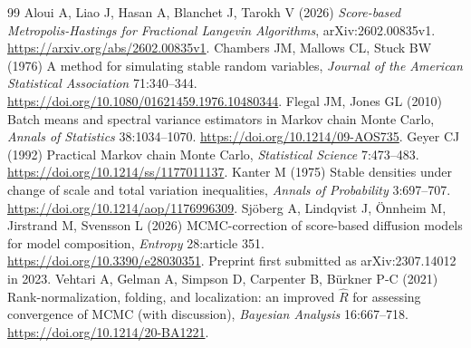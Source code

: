\documentclass[11pt]{article}
\theoremstyle{definition}\newtheorem{definition}[theorem]{Definition}
\theoremstyle{remark}\newtheorem{remark}[theorem]{Remark}
\numberwithin{equation}{section}
\newcommand{\1}{\mathbf 1}
\begin{document}
\begin{thebibliography}{99}
 Aloui A, Liao J, Hasan A, Blanchet J, Tarokh V (2026) \emph{Score-based Metropolis-Hastings for Fractional Langevin Algorithms}, arXiv:2602.00835v1. \url{https://arxiv.org/abs/2602.00835v1}.
 Chambers JM, Mallows CL, Stuck BW (1976) A method for simulating stable random variables,
\emph{Journal of the American Statistical Association} 71:340--344. \url{https://doi.org/10.1080/01621459.1976.10480344}.
 Flegal JM, Jones GL (2010) Batch means and spectral variance estimators in Markov chain Monte Carlo, \emph{Annals of Statistics} 38:1034--1070. \url{https://doi.org/10.1214/09-AOS735}.
 Geyer CJ (1992) Practical Markov chain Monte Carlo,
\emph{Statistical Science} 7:473--483. \url{https://doi.org/10.1214/ss/1177011137}.
 Kanter M (1975) Stable densities under change of scale and total variation inequalities,
\emph{Annals of Probability} 3:697--707. \url{https://doi.org/10.1214/aop/1176996309}.
 Sj\"oberg A, Lindqvist J, \"Onnheim M, Jirstrand M, Svensson L (2026) MCMC-correction of score-based diffusion models for model composition,
\emph{Entropy} 28:article 351. \url{https://doi.org/10.3390/e28030351}. Preprint first submitted as arXiv:2307.14012 in 2023.
 Vehtari A, Gelman A, Simpson D, Carpenter B, B\"urkner P-C (2021) Rank-normalization, folding, and localization: an improved $\widehat R$ for assessing convergence of MCMC (with discussion), \emph{Bayesian Analysis} 16:667--718. \url{https://doi.org/10.1214/20-BA1221}.
\end{thebibliography}
\end{document}
